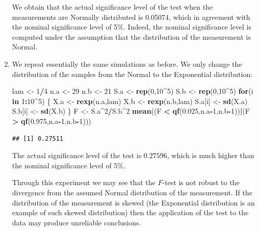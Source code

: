 \documentclass[]{krantz}
\makeatletter
\newenvironment{Shaded}{\begin{snugshade}}{\end{snugshade}}
\newcommand{\KeywordTok}[1]{\textcolor[rgb]{0.13,0.29,0.53}{\textbf{#1}}}
\newcommand{\DecValTok}[1]{\textcolor[rgb]{0.00,0.00,0.81}{#1}}
\newcommand{\FloatTok}[1]{\textcolor[rgb]{0.00,0.00,0.81}{#1}}
\newcommand{\StringTok}[1]{\textcolor[rgb]{0.31,0.60,0.02}{#1}}
\newcommand{\ControlFlowTok}[1]{\textcolor[rgb]{0.13,0.29,0.53}{\textbf{#1}}}
\newcommand{\OperatorTok}[1]{\textcolor[rgb]{0.81,0.36,0.00}{\textbf{#1}}}
\newcommand{\NormalTok}[1]{#1}
\newenvironment{kframe}{%
\medskip{}
\setlength{\fboxsep}{.8em}
 \def\at@end@of@kframe{}%
 \ifinner\ifhmode%
  \def\at@end@of@kframe{\end{minipage}}%
  \begin{minipage}{\columnwidth}%
 \fi\fi%
 \def\FrameCommand##1{\hskip\@totalleftmargin \hskip-\fboxsep
 \colorbox{shadecolor}{##1}\hskip-\fboxsep
     \hskip-\linewidth \hskip-\@totalleftmargin \hskip\columnwidth}%
 \MakeFramed {\advance\hsize-\width
   \@totalleftmargin\z@ \linewidth\hsize
   \@setminipage}}%
 {\par\unskip\endMakeFramed%
 \at@end@of@kframe}
\renewenvironment{Shaded}{\begin{kframe}}{\end{kframe}}
\theoremstyle{definition}
\theoremstyle{definition}
\theoremstyle{definition}
\theoremstyle{remark}
\makeatother
\begin{document}
\begin{enumerate}
  We obtain that the actual significance level of the test when the
  measurements are Normally distributed is 0.05074, which in agreement
  with the nominal significance level of 5\%. Indeed, the nominal
  significance level is computed under the assumption that the
  distribution of the measurement is Normal.
\item
  We repeat essentially the same simulations as before. We only change
  the distribution of the samples from the Normal to the Exponential
  distribution:

\begin{Shaded}
\begin{Highlighting}[]
\NormalTok{lam <-}\StringTok{ }\DecValTok{1}\OperatorTok{/}\DecValTok{4}
\NormalTok{n.a <-}\StringTok{ }\DecValTok{29}
\NormalTok{n.b <-}\StringTok{ }\DecValTok{21}
\NormalTok{S.a <-}\StringTok{ }\KeywordTok{rep}\NormalTok{(}\DecValTok{0}\NormalTok{,}\DecValTok{10}\OperatorTok{^}\DecValTok{5}\NormalTok{)}
\NormalTok{S.b <-}\StringTok{ }\KeywordTok{rep}\NormalTok{(}\DecValTok{0}\NormalTok{,}\DecValTok{10}\OperatorTok{^}\DecValTok{5}\NormalTok{)}
\ControlFlowTok{for}\NormalTok{(i }\ControlFlowTok{in} \DecValTok{1}\OperatorTok{:}\DecValTok{10}\OperatorTok{^}\DecValTok{5}\NormalTok{) \{}
\NormalTok{  X.a <-}\StringTok{ }\KeywordTok{rexp}\NormalTok{(n.a,lam)}
\NormalTok{  X.b <-}\StringTok{ }\KeywordTok{rexp}\NormalTok{(n.b,lam)}
\NormalTok{  S.a[i] <-}\StringTok{ }\KeywordTok{sd}\NormalTok{(X.a)}
\NormalTok{  S.b[i] <-}\StringTok{ }\KeywordTok{sd}\NormalTok{(X.b)}
\NormalTok{\}}
\NormalTok{F <-}\StringTok{ }\NormalTok{S.a}\OperatorTok{^}\DecValTok{2}\OperatorTok{/}\NormalTok{S.b}\OperatorTok{^}\DecValTok{2}
\KeywordTok{mean}\NormalTok{((F }\OperatorTok{<}\StringTok{ }\KeywordTok{qf}\NormalTok{(}\FloatTok{0.025}\NormalTok{,n.a}\OperatorTok{-}\DecValTok{1}\NormalTok{,n.b}\OperatorTok{-}\DecValTok{1}\NormalTok{))}\OperatorTok{|}\NormalTok{(F }\OperatorTok{>}\StringTok{ }\KeywordTok{qf}\NormalTok{(}\FloatTok{0.975}\NormalTok{,n.a}\OperatorTok{-}\DecValTok{1}\NormalTok{,n.b}\OperatorTok{-}\DecValTok{1}\NormalTok{)))}
\end{Highlighting}
\end{Shaded}

\begin{verbatim}
## [1] 0.27511
\end{verbatim}

  The actual significance level of the test is \(0.27596\), which is
  much higher than the nominal significance level of 5\%.

  Through this experiment we may see that the \(F\)-test is not robust
  to the divergence from the assumed Normal distribution of the
  measurement. If the distribution of the measurement is skewed (the
  Exponential distribution is an example of such skewed distribution)
  then the application of the test to the data may produce unreliable
  conclusions.
\end{enumerate}
\end{document}
